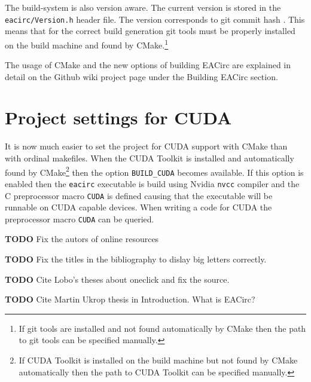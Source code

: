 \documentclass[12pt,oneside]{fithesis2}
\newcommand{\todo}{
	\noindent
	{\large\color{red}\textbf{TODO}}
}
\begin{document}
\noindent
The build-system is also version aware. The current version is stored in the \texttt{eacirc/Version.h} header file. The version corresponds to git commit hash \cite{git_book}. This means that for the correct build generation git tools must be properly installed on the build machine and found by CMake.\footnote{If git tools are installed and not found automatically by CMake then the path to git tools can be specified manually.}

The usage of CMake and the new options of building EACirc are explained in detail on the Github wiki project page under the Building EACirc section.

\section{Project settings for CUDA}

It is now much easier to set the project for CUDA support with CMake than with ordinal makefiles. When the CUDA Toolkit \cite{cuda_toolkit} is installed and automatically found by CMake\footnote{If CUDA Toolkit is installed on the build machine but not found by CMake automatically then the path to CUDA Toolkit can be specified manually.} then the option \texttt{BUILD\_CUDA} becomes available. If this option is enabled then the \texttt{eacirc} executable is build using Nvidia \cite{nvidia} \texttt{nvcc} compiler and the C preprocessor macro \texttt{CUDA} is defined causing that the executable will be runnable on CUDA capable devices. When writing a code for CUDA the preprocessor macro \texttt{CUDA} can be queried.

\printbibliography[heading=bibintoc]
\todo{Fix the autors of online resources}

\todo{Fix the titles in the bibliography to dislay big letters correctly.}

\todo{Cite Lobo's theses about oneclick and fix the source.}

\todo{Cite Martin Ukrop thesis in Introduction. What is EACirc?}
\end{document}
